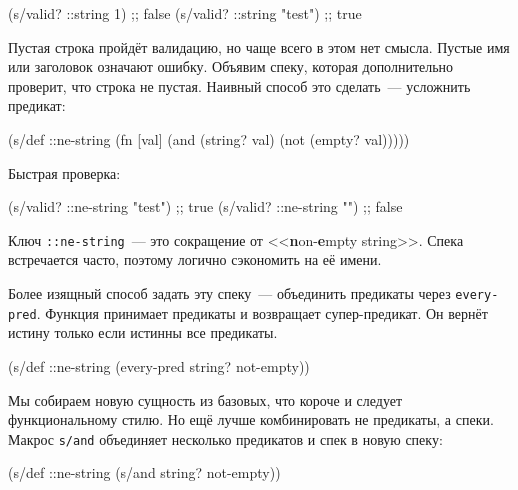 \begin{english}
  \begin{clojure}
(s/valid? ::string 1)      ;; false
(s/valid? ::string "test") ;; true
  \end{clojure}
\end{english}

Пустая строка пройдёт валидацию, но чаще всего в этом нет смысла. Пустые имя или
заголовок означают ошибку. Объявим спеку, которая дополнительно проверит, что
строка не пустая. Наивный способ это сделать~--- усложнить предикат:


\begin{english}
  \begin{clojure}
(s/def ::ne-string
  (fn [val]
    (and (string? val)
         (not (empty? val)))))
  \end{clojure}
\end{english}

\noindent
Быстрая проверка:

\begin{english}
  \begin{clojure}
(s/valid? ::ne-string "test") ;; true
(s/valid? ::ne-string "")     ;; false
  \end{clojure}
\end{english}

Ключ \verb|::ne-string|~--- это сокращение от <<\textbf{n}on-\textbf{e}mpty
string>>. Спека встречается часто, поэтому логично сэкономить на её имени.

Более изящный способ задать эту спеку~--- объединить предикаты через
\verb|every-pred|. Функция принимает предикаты и возвращает супер-предикат. Он
вернёт истину только если истинны все предикаты.

\begin{english}
  \begin{clojure}
(s/def ::ne-string
  (every-pred string? not-empty))
  \end{clojure}
\end{english}


Мы собираем новую сущность из базовых, что короче и следует функциональному
стилю. Но ещё лучше комбинировать не предикаты, а спеки. Макрос \verb|s/and|
объединяет несколько предикатов и спек в новую спеку:

\begin{english}
  \begin{clojure}
(s/def ::ne-string
  (s/and string? not-empty))
  \end{clojure}
\end{english}

